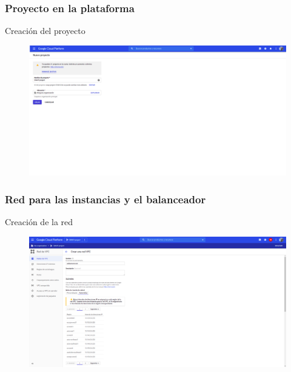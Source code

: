 \documentclass{beamer}
\begin{document}
\subsubsection{Proyecto en la plataforma}

\begin{frame}[fragile]{Creación del proyecto}
  \begin{figure}[H]
		\centering
		\includegraphics[width=\textwidth]{project/create_project.png}
	\end{figure}
\end{frame}

\subsubsection{Red para las instancias y el balanceador}

\begin{frame}[fragile]{Creación de la red}
  \begin{figure}[H]
		\centering
		\includegraphics[width=\textwidth]{project/vpc_creation.png}
	\end{figure}
\end{frame}
\end{document}
